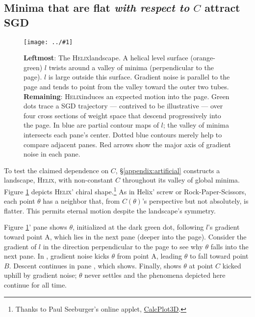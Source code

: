\documentclass[final,12pt]{colt2021} %
\newcommand{\offour}[1]{
    {\tiny \raisebox{0.04cm}{$
        \ifthenelse{\equal{#1}{0}}{{\color{moor}\blacksquare}}{\square}
        \ifthenelse{\equal{#1}{1}}{{\color{moor}\blacksquare}}{\square}    
        \ifthenelse{\equal{#1}{2}}{{\color{moor}\blacksquare}}{\square}
        \ifthenelse{\equal{#1}{3}}{{\color{moor}\blacksquare}}{\square}
    $}}%
}
\newcommand{\plotmoow}[3]{\texttt{[image: ../\#1]}}
\newcommand{\plotmooh}[3]{\texttt{[image: ../\#1]}}
\newcommand{\Helix}{\textsc{Helix}}
\begin{document}
        \subsection{Minima that are flat \emph{with respect to} $C$ attract SGD}
            \begin{figure}[h!]
                \centering
                \rotatebox[origin=c]{-90}{\plotmooh{plots/from-above}{}{0.19\textwidth}}
                \plotmoow{colt/screw-trajectory}{0.79\textwidth}{} 
                \caption{%
                    \textbf{Leftmost}: The \Helix landscape.  A helical level
                    surface (orange-green) $l$ twists around a valley of minima
                    (perpendicular to the page).  $l$ is large outside this
                    surface.  Gradient noise is parallel to the page and tends
                    to point from the valley toward the outer two tubes.
                    \textbf{Remaining}: \Helix induces an expected motion into
                    the page.  Green dots trace a SGD trajectory --- contrived
                    to be illustrative --- over four cross sections of weight
                    space that descend progressively into the page.  In blue
                    are partial contour maps of $l$; the valley of minima
                    intersects each pane's center.  Dotted blue contours merely
                    help to compare adjacent panes.  Red arrows show the major
                    axis of gradient noise in each pane.  
                }
                \label{fig:archimedes}
            \end{figure}

            \label{subsect:entropic}
            To test the claimed dependence on $C$, \S\ref{appendix:artificial}
            constructs a landscape, \Helix, with non-constant $C$ throughout
            its valley of global minima.  Figure \ref{fig:archimedes} 
            depicts \Helix' chiral shape.\footnote{
                Thanks to Paul Seeburger's online applet,
                \href{https://www.monroecc.edu/faculty/paulseeburger/calcnsf/CalcPlot3D/}{CalcPlot3D}.
            }  As in
            Helix' screw or Rock-Paper-Scissors, each point $\theta$ has a
            neighbor that, from $C(\theta)$'s perspective but not absolutely, is
            flatter.  This permits eternal motion despite the landscape's symmetry.

            Figure \ref{fig:archimedes}' pane\protect\offour{0} shows $\theta$,
            initialized at the dark green dot, following $l$'s gradient toward
            point A, which lies in the next pane (deeper into the page).
            Consider the gradient of $l$ in the direction perpendicular to the
            page to see why $\theta$ falls into the next pane.
            In\protect\offour{1}, gradient noise kicks $\theta$ from point A,
            leading $\theta$ to fall toward point $B$.  Descent continues
            in pane\protect\offour{2}, which shows.
            Finally,\protect\offour{3} shows
            $\theta$ at point $C$ kicked uphill by gradient noise; $\theta$
            never settles and the phenomena depicted here continue for all
            time.
\end{document}
